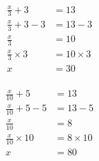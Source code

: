 \documentclass[12pt]{article}
\newcounter{minipagecount}
\begin{document}
\begin{multicols}{2}
\begin{minipage}[t]{0.45\textwidth}
    \raggedright %
    \begin{align*} %
        \frac{x}{3} + 3 &= 13\\
        \frac{x}{3} + 3 - 3 &= 13 - 3\\
        \frac{x}{3} &= 10\\
        \frac{x}{3} \times3 &= 10 \times3\\
        x &= 30\\
    \end{align*}
\end{minipage} %
\noindent{(\theminipagecount)}\hspace{0.1mm} %
\begin{minipage}[t]{0.45\textwidth} %
    \vspace{-26pt}  %
    \raggedright %
    \begin{align*} %
        \frac{x}{10} + 5 &= 13\\
        \frac{x}{10} + 5 - 5 &= 13 - 5\\
        \frac{x}{10} &= 8\\
        \frac{x}{10} \times10 &= 8 \times10\\
        x &= 80\\
    \end{align*}
\end{minipage} %
\noindent{(\theminipagecount)}\hspace{0.1mm} %
\begin{minipage}[t]{0.45\textwidth} %

\end{minipage}
\end{multicols}
\end{document}
